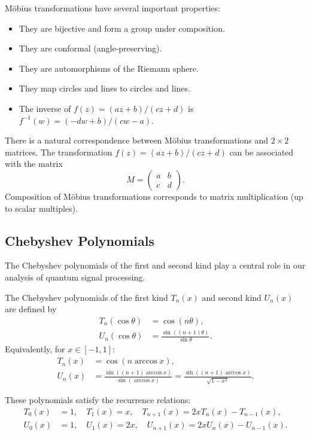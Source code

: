 Möbius transformations have several important properties:
\begin{itemize}
    \item They are bijective and form a group under composition.
    \item They are conformal (angle-preserving).
    \item They are automorphisms of the Riemann sphere.
    \item They map circles and lines to circles and lines.
    \item The inverse of $f(z) = (az+b)/(cz+d)$ is $f^{-1}(w) = (-dw+b)/(cw-a)$.
\end{itemize}

There is a natural correspondence between Möbius transformations and $2 \times 2$ matrices. The transformation $f(z) = (az+b)/(cz+d)$ can be associated with the matrix
\begin{equation}
    M = \begin{pmatrix} a & b \\ c & d \end{pmatrix}.
\end{equation}
Composition of Möbius transformations corresponds to matrix multiplication (up to scalar multiples).

\subsection{Chebyshev Polynomials}

The Chebyshev polynomials of the first and second kind play a central role in our analysis of quantum signal processing.

\begin{definition}
The Chebyshev polynomials of the first kind $T_n(x)$ and second kind $U_n(x)$ are defined by
\begin{align}
    T_n(\cos\theta) &= \cos(n\theta), \\
    U_n(\cos\theta) &= \frac{\sin((n+1)\theta)}{\sin\theta}.
\end{align}
Equivalently, for $x \in [-1,1]$:
\begin{align}
    T_n(x) &= \cos(n \arccos x), \\
    U_n(x) &= \frac{\sin((n+1)\arccos x)}{\sin(\arccos x)} = \frac{\sin((n+1)\arccos x)}{\sqrt{1-x^2}}.
\end{align}
\end{definition}

These polynomials satisfy the recurrence relations:
\begin{align}
    T_0(x) &= 1, \quad T_1(x) = x, \quad T_{n+1}(x) = 2xT_n(x) - T_{n-1}(x), \\
    U_0(x) &= 1, \quad U_1(x) = 2x, \quad U_{n+1}(x) = 2xU_n(x) - U_{n-1}(x).
\end{align}
